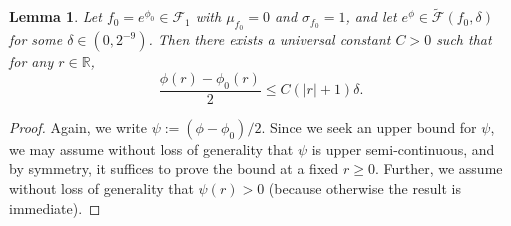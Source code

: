 \documentclass[a4paper,12pt]{article}
\newtheorem{lemma}[theorem]{Lemma}
\begin{document}
\begin{lemma}
  \label{Lem:EnvelopeUpperBound}
  Let $f_0 = e^{\phi_0} \in \mathcal{F}_1$ with $\mu_{f_0}=0$ and $\sigma_{f_0}=1$, and let $e^{\phi} \in \tilde{\mathcal{F}}(f_0, \delta)$ for some $\delta \in (0,2^{-9})$.  Then there exists a universal constant $C > 0$ such that for any $r \in \mathbb{R}$,
  \[
    \frac{\phi(r) - \phi_0(r)}{2} \leq C (|r|+1) \delta. 
  \]
\end{lemma}
\begin{proof}
Again, we write $\psi := (\phi - \phi_0)/2$.  Since we seek an upper bound for $\psi$, we may assume without loss of generality that $\psi$ is upper semi-continuous, and by symmetry, it suffices to prove the bound at a fixed $r \geq 0$.  Further, we assume without loss of generality that $\psi(r) > 0$ (because otherwise the result is immediate).  


\end{proof}
\end{document}

